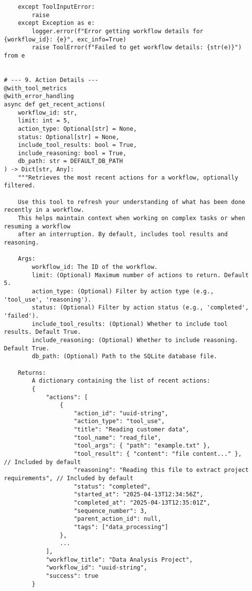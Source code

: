 \documentclass[12pt,a4paper]{article}
\begin{document}
\begin{pageablecode}
\begin{verbatim}
    except ToolInputError:
        raise
    except Exception as e:
        logger.error(f"Error getting workflow details for {workflow_id}: {e}", exc_info=True)
        raise ToolError(f"Failed to get workflow details: {str(e)}") from e
    

# --- 9. Action Details ---
@with_tool_metrics
@with_error_handling
async def get_recent_actions(
    workflow_id: str,
    limit: int = 5,
    action_type: Optional[str] = None,
    status: Optional[str] = None,
    include_tool_results: bool = True,
    include_reasoning: bool = True,
    db_path: str = DEFAULT_DB_PATH
) -> Dict[str, Any]:
    """Retrieves the most recent actions for a workflow, optionally filtered.

    Use this tool to refresh your understanding of what has been done recently in a workflow.
    This helps maintain context when working on complex tasks or when resuming a workflow
    after an interruption. By default, includes tool results and reasoning.

    Args:
        workflow_id: The ID of the workflow.
        limit: (Optional) Maximum number of actions to return. Default 5.
        action_type: (Optional) Filter by action type (e.g., 'tool_use', 'reasoning').
        status: (Optional) Filter by action status (e.g., 'completed', 'failed').
        include_tool_results: (Optional) Whether to include tool results. Default True.
        include_reasoning: (Optional) Whether to include reasoning. Default True.
        db_path: (Optional) Path to the SQLite database file.

    Returns:
        A dictionary containing the list of recent actions:
        {
            "actions": [
                {
                    "action_id": "uuid-string",
                    "action_type": "tool_use",
                    "title": "Reading customer data",
                    "tool_name": "read_file",
                    "tool_args": { "path": "example.txt" },
                    "tool_result": { "content": "file content..." }, // Included by default
                    "reasoning": "Reading this file to extract project requirements", // Included by default
                    "status": "completed",
                    "started_at": "2025-04-13T12:34:56Z",
                    "completed_at": "2025-04-13T12:35:01Z",
                    "sequence_number": 3,
                    "parent_action_id": null,
                    "tags": ["data_processing"]
                },
                ...
            ],
            "workflow_title": "Data Analysis Project",
            "workflow_id": "uuid-string",
            "success": true
        }


\end{verbatim}
\end{pageablecode}
\end{document}

